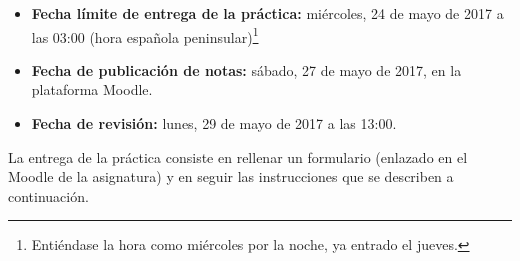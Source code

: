 \begin{itemize}
  \item \textbf{Fecha límite de entrega de la práctica:} miércoles, 24 de mayo de 2017 a las 03:00 (hora española peninsular)\footnote{Entiéndase la hora como miércoles por la noche, ya entrado el jueves.}

  \item \textbf{Fecha de publicación de notas:} sábado, 27 de mayo de 2017, en la plataforma Moodle.

  \item \textbf{Fecha de revisión:} lunes, 29 de mayo de 2017 a las 13:00.
\end{itemize}

La entrega de la práctica consiste en rellenar un formulario (enlazado en el Moodle de la asignatura) y en seguir las instrucciones que se describen a continuación.

